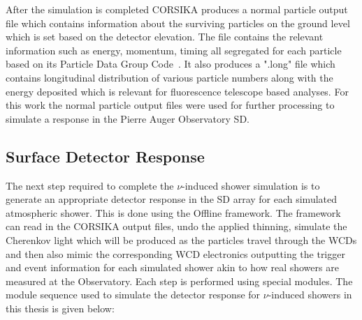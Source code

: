 After the simulation is completed CORSIKA produces a normal particle output file which contains information about the surviving particles on the ground level which is set based on the detector elevation. The file contains the relevant information such as energy, momentum, timing all segregated for each particle based on its Particle Data Group Code~\cite{}. It also produces a ".long" file which contains longitudinal distribution of various particle numbers along with the energy deposited which is relevant for fluorescence telescope based analyses. For this work the normal particle output files were used for further processing to simulate a response in the Pierre Auger Observatory SD.

\subsection{Surface Detector Response}
\label{subsec:sim_SD_resp}

The next step required to complete the $\nu$-induced shower simulation is to generate an appropriate detector response in the SD array for each simulated atmospheric shower. This is done using the Offline framework. The framework can read in the CORSIKA output files, undo the applied thinning, simulate the Cherenkov light which will be produced as the particles travel through the WCDs and then also mimic the corresponding WCD electronics outputting the trigger and event information for each simulated shower akin to how real showers are measured at the Observatory. Each step is performed using special modules. The module sequence used to simulate the detector response for $\nu$-induced showers in this thesis is given below: 



